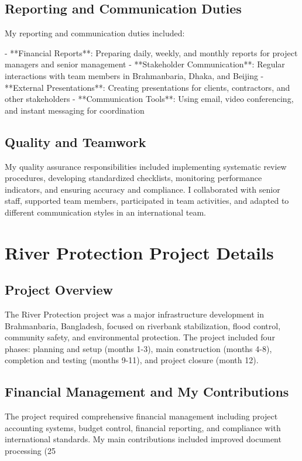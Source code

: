 \subsection{Reporting and Communication Duties}
My reporting and communication duties included:

- **Financial Reports**: Preparing daily, weekly, and monthly reports for project managers and senior management
- **Stakeholder Communication**: Regular interactions with team members in Brahmanbaria, Dhaka, and Beijing
- **External Presentations**: Creating presentations for clients, contractors, and other stakeholders
- **Communication Tools**: Using email, video conferencing, and instant messaging for coordination

\subsection{Quality and Teamwork}
My quality assurance responsibilities included implementing systematic review procedures, developing standardized checklists, monitoring performance indicators, and ensuring accuracy and compliance. I collaborated with senior staff, supported team members, participated in team activities, and adapted to different communication styles in an international team.

\vspace{0.5em}
\section{River Protection Project Details}

\subsection{Project Overview}
The River Protection project was a major infrastructure development in Brahmanbaria, Bangladesh, focused on riverbank stabilization, flood control, community safety, and environmental protection. The project included four phases: planning and setup (months 1-3), main construction (months 4-8), completion and testing (months 9-11), and project closure (month 12).

\subsection{Financial Management and My Contributions}
The project required comprehensive financial management including project accounting systems, budget control, financial reporting, and compliance with international standards. My main contributions included improved document processing (25%


